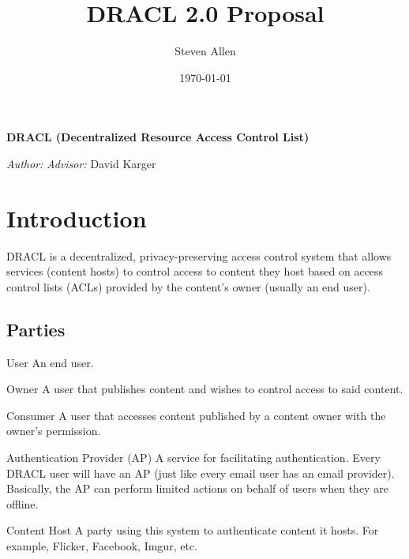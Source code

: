 \documentclass[pdftex,12pt,a4papaer]{article}
\title{DRACL 2.0 Proposal}
\author{Steven Allen}
\date{\today}
\begin{document}
\thispagestyle{plain}

\begin{center}
    \vspace*{\fill}
    {%
        \onehalfspacing \bfseries \Large
        DRACL (Decentralized Resource Access Control List) \\
    }

    \vspace{\fill}
    {\large
    \begin{minipage}{0.9\textwidth}
        \emph{Author:} \theauthor \hfill \emph{Advisor:} David Karger
        \\
        \begin{center}
              \thedate
        \end{center}
    \end{minipage}
    }
    \vspace*{\fill}
\end{center}

\section{Introduction} 

DRACL is a decentralized, privacy-preserving access control system that allows
services (content hosts) to control access to content they host based on access
control lists (ACLs) provided by the content's owner (usually an end user).


\subsection{Parties}

\begin{compactdesc}
    \item[User] An end user.
    \item[Owner] A user that publishes content and wishes to control
        access to said content.
    \item[Consumer] A user that accesses content published by a content owner
        with the owner's permission.
    \item[Authentication Provider] (AP) A service for facilitating
        authentication. Every DRACL user will have an AP (just like every email
        user has an email provider). Basically, the AP can perform limited
        actions on behalf of users when they are offline.
    \item[Content Host] A party using this system to authenticate content it
        hosts. For example, Flicker, Facebook, Imgur, etc.
\end{compactdesc}
\end{document}
